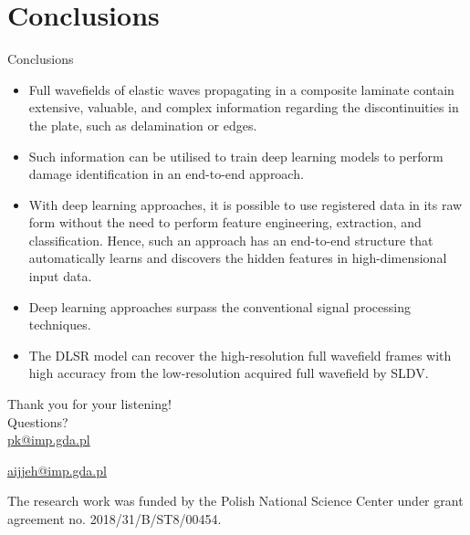 \documentclass[10pt,aspectratio=169,dvipsnames]{beamer} %
\begin{document}
\section{Conclusions}
\begin{frame}{Conclusions}
	\footnotesize
	\begin{itemize}
		\item Full wavefields of elastic waves propagating in a composite laminate contain extensive, valuable, and complex information regarding the discontinuities in the plate, such as delamination or edges.
		\item Such information can be utilised to train deep learning models
		to perform damage identification in an end-to-end approach.
		\item With deep	learning approaches, it is possible to use registered data in its raw form without the need to perform feature engineering, extraction, and classification. 
		Hence, such an approach has an end-to-end structure that automatically learns and discovers the hidden features in high-dimensional input data.
		\item Deep learning approaches surpass the conventional signal processing techniques.
		\item The DLSR model can recover the high-resolution full wavefield
		frames with high accuracy from the low-resolution acquired full wavefield by SLDV.
	\end{itemize}
\end{frame}

{
\begin{frame}[standout]
	Thank you for your listening!\\ \vspace{12pt}
	Questions?\\ \vspace{12pt}
	\url{pk@imp.gda.pl} 
	\par\medskip
	\url{aijjeh@imp.gda.pl}
	
 
\par\medskip
\par\medskip
\footnotesize
The research work was funded by the Polish National Science Center under grant agreement no. 2018/31/B/ST8/00454.
\end{frame}
}
\end{document}
